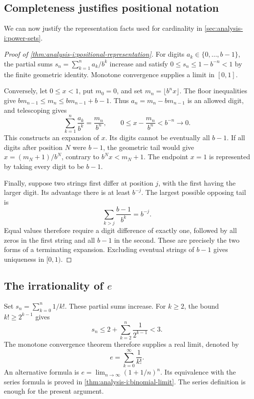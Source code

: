 \subsection{Completeness justifies positional notation}
We can now justify the representation facts used for cardinality in
\autoref{sec:analysis-i:power-sets}.
\begin{proof}[Proof of \autoref{thm:analysis-i:positional-representation}]
  For digits $a_k\in\{0,\ldots,b-1\}$, the partial sums
  $s_n=\sum_{k=1}^{n}a_k/b^k$ increase and satisfy
  $0\leq s_n\leq1-b^{-n}<1$ by the finite geometric identity.
  Monotone convergence supplies a limit in $[0,1]$.

  Conversely, let $0\leq x<1$, put $m_0=0$, and set
  $m_n=\lfloor b^nx\rfloor$. The floor inequalities give
  $bm_{n-1}\leq m_n\leq bm_{n-1}+b-1$.
  Thus $a_n=m_n-bm_{n-1}$ is an allowed digit, and telescoping gives
  \[
    \sum_{k=1}^{n}\frac{a_k}{b^k}=\frac{m_n}{b^n},\qquad
    0\leq x-\frac{m_n}{b^n}<b^{-n}\longrightarrow0.
  \]
  This constructs an expansion of $x$. Its digits cannot be eventually
  all $b-1$. If all digits after position $N$ were $b-1$, the geometric
  tail would give $x=(m_N+1)/b^N$, contrary to $b^Nx<m_N+1$.
  The endpoint $x=1$ is represented by taking every digit to be $b-1$.

  Finally, suppose two strings first differ at position $j$, with the
  first having the larger digit. Its advantage there is at least $b^{-j}$.
  The largest possible opposing tail is
  \[
    \sum_{k>j}\frac{b-1}{b^k}=b^{-j}.
  \]
  Equal values therefore require a digit difference of exactly one,
  followed by all zeros in the first string and all $b-1$ in the second.
  These are precisely the two forms of a terminating expansion.
  Excluding eventual strings of $b-1$ gives uniqueness in $[0,1)$.
\end{proof}

\subsection{The irrationality of $e$}
Set $s_n=\sum_{k=0}^{n}1/k!$. These partial sums increase.
For $k\geq2$, the bound $k!\geq2^{k-1}$ gives
\[
  s_n\leq2+\sum_{k=2}^{n}\frac1{2^{k-1}}<3.
\]
The monotone convergence theorem therefore supplies a real limit, denoted by
\[
  e=\sum_{k=0}^{\infty}\frac1{k!}.
\]
An alternative formula is $e=\lim_{n\to\infty}(1+1/n)^n$.
Its equivalence with the series formula is proved in
\autoref{thm:analysis-i:binomial-limit}. The series definition is enough
for the present argument.

